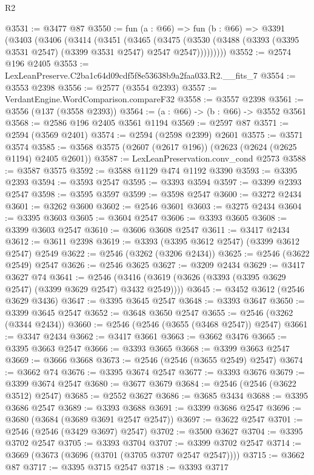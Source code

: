 \begin{lexlean}{R2}
\begin{coremodule}
@3531 := @3477 @87
@3550 := fun (a : @66) =>
  fun (b : @66) =>
  @3391
    (@3403
      (@3406
        (@3414
          (@3451
            (@3465
              (@3475
                (@3530 (@3488 (@3393 (@3395 @3531 @2547) (@3399 @3531 @2547) @2547 @2547)))))))))
@3552 := @2574 @196 @2405
@3553 := LexLeanPreserve.C2ba1c64d09cdf5f8e53638b9a2faa033.R2.__fits_7
@3554 := @3553 @2398
@3556 := @2577 (@3554 @2393)
@3557 := VerdantEngine.WordComparison.compareF32
@3558 := @3557 @2398
@3561 := @3556 (@137 (@3558 @2393))
@3564 := (a : @66) -> (b : @66) -> @3552 @3561
@3568 := @2586 @196 @2405 @3561 @1194
@3569 := @2597 @87
@3571 := @2594 (@3569 @2401)
@3574 := @2594 (@2598 @2399) @2601
@3575 := @3571 @3574
@3585 := @3568 @3575 (@2607 (@2617 @196)) (@2623 (@2624 (@2625 @1194) @2405 @2601))
@3587 := LexLeanPreservation.conv_cond @2573
@3588 := @3587 @3575
@3592 := @3588 @1129 @474 @1192 @3390
@3593 := @3395 @2393
@3594 := @3593 @2547
@3595 := @3393 @3594
@3597 := @3399 @2393 @2547
@3598 := @3595 @3597
@3599 := @3598 @2547
@3600 := @3272 @2434
@3601 := @3262 @3600
@3602 := @2546 @3601
@3603 := @3275 @2434
@3604 := @3395 @3603
@3605 := @3604 @2547
@3606 := @3393 @3605
@3608 := @3399 @3603 @2547
@3610 := @3606 @3608 @2547
@3611 := @3417 @2434
@3612 := @3611 @2398
@3619 := @3393 (@3395 @3612 @2547) (@3399 @3612 @2547) @2549
@3622 := @2546 (@3262 (@3206 @2434))
@3625 := @2546 (@3622 @2549) @2547
@3626 := @2546 @3625
@3627 := @3209 @2434
@3629 := @3417 @3627 @74
@3641 := @2546 (@3416 (@3619 (@3626 (@3393 (@3395 @3629 @2547) (@3399 @3629 @2547) @3432 @2549))))
@3645 := @3452 @3612 (@2546 @3629 @3436)
@3647 := @3395 @3645 @2547
@3648 := @3393 @3647
@3650 := @3399 @3645 @2547
@3652 := @3648 @3650 @2547
@3655 := @2546 (@3262 (@3344 @2434))
@3660 := @2546 (@2546 (@3655 (@3468 @2547)) @2547)
@3661 := @3347 @2434
@3662 := @3417 @3661
@3663 := @3662 @3476
@3665 := @3395 @3663 @2547
@3666 := @3393 @3665
@3668 := @3399 @3663 @2547
@3669 := @3666 @3668
@3673 := @2546 (@2546 (@3655 @2549) @2547)
@3674 := @3662 @74
@3676 := @3395 @3674 @2547
@3677 := @3393 @3676
@3679 := @3399 @3674 @2547
@3680 := @3677 @3679
@3684 := @2546 (@2546 (@3622 @3512) @2547)
@3685 := @2552 @3627
@3686 := @3685 @3434
@3688 := @3395 @3686 @2547
@3689 := @3393 @3688
@3691 := @3399 @3686 @2547
@3696 := @3680 (@3684 (@3689 @3691 @2547 @2547))
@3697 := @3622 @2547
@3701 := @2546 (@2546 (@3429 @3697) @2547)
@3702 := @3500 @3627
@3704 := @3395 @3702 @2547
@3705 := @3393 @3704
@3707 := @3399 @3702 @2547
@3714 := @3669 (@3673 (@3696 (@3701 (@3705 @3707 @2547 @2547))))
@3715 := @3662 @87
@3717 := @3395 @3715 @2547
@3718 := @3393 @3717

\end{coremodule}
\end{lexlean}
